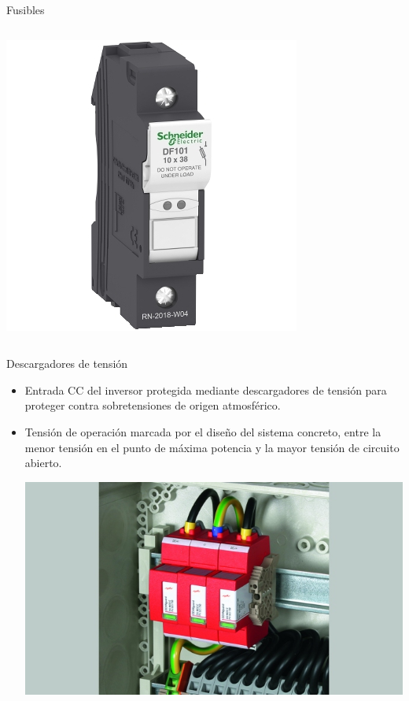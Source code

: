 \documentclass[aspectratio=169, usenames,svgnames,dvipsnames]{beamer}
\begin{document}
\begin{frame}[label={sec:org021f6fe}]{Fusibles}
\begin{columns}
\begin{column}{0.5\columnwidth}
\begin{center}
\includegraphics[height=0.4\textheight]{../figs/portafusible.JPG}
\end{center}
\end{column}
\end{columns}
\end{frame}

\begin{frame}[label={sec:org19b1d28}]{Descargadores de tensión}
\begin{itemize}
\item Entrada CC del inversor protegida mediante \alert{descargadores de tensión} para
proteger contra sobretensiones de origen atmosférico.

\item Tensión de operación marcada por el diseño del sistema concreto,
entre la menor tensión en el punto de máxima potencia y la mayor
tensión de circuito abierto.

\begin{center}
\includegraphics[height=0.5\textheight]{../figs/varistorDEHN.jpg}
\end{center}
\end{itemize}
\end{frame}
\end{document}
